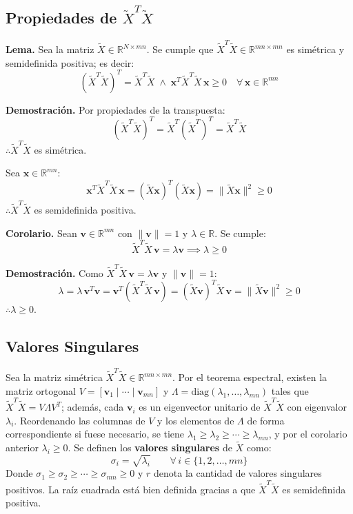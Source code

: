 \subsection{Propiedades de $\tilde{X}^T\tilde{X}$}

\textbf{Lema.} Sea la matriz $\tilde{X} \in \mathbb{R}^{N \times mn}$. Se cumple
que $\tilde{X}^T\tilde{X} \in \mathbb{R}^{mn \times mn}$ es simétrica y
semidefinida positiva; es decir:
\[
(\tilde{X}^T\tilde{X})^T = \tilde{X}^T\tilde{X}
\;\land\;
\mathbf{x}^T\tilde{X}^T\tilde{X}\,\mathbf{x} \geq 0
\quad \forall \, \mathbf{x} \in \mathbb{R}^{mn}
\]

\textbf{Demostración.} Por propiedades de la transpuesta:
\[
(\tilde{X}^T\tilde{X})^T = \tilde{X}^T(\tilde{X}^T)^T = \tilde{X}^T\tilde{X}
\]
$\therefore \tilde{X}^T\tilde{X}$ es simétrica.

Sea $\mathbf{x} \in \mathbb{R}^{mn}$:
\[
\mathbf{x}^T\tilde{X}^T\tilde{X}\,\mathbf{x}
= (\tilde{X}\mathbf{x})^T(\tilde{X}\mathbf{x})
= \|\tilde{X}\mathbf{x}\|^2 \geq 0
\]
$\therefore \tilde{X}^T\tilde{X}$ es semidefinida positiva.

\textbf{Corolario.} Sean $\mathbf{v} \in \mathbb{R}^{mn}$ con
$\|\mathbf{v}\| = 1$ y $\lambda \in \mathbb{R}$. Se cumple:
\[
\tilde{X}^T\tilde{X}\,\mathbf{v} = \lambda\mathbf{v} \implies \lambda \geq 0
\]

\textbf{Demostración.} Como $\tilde{X}^T\tilde{X}\,\mathbf{v} = \lambda\mathbf{v}$
y $\|\mathbf{v}\| = 1$:
\[
\lambda = \lambda\,\mathbf{v}^T\mathbf{v}
= \mathbf{v}^T(\tilde{X}^T\tilde{X}\,\mathbf{v})
= (\tilde{X}\mathbf{v})^T\tilde{X}\,\mathbf{v}
= \|\tilde{X}\mathbf{v}\|^2 \geq 0
\]
$\therefore \lambda \geq 0$.


\subsection{Valores Singulares}

Sea la matriz simétrica $\tilde{X}^T\tilde{X} \in \mathbb{R}^{mn \times mn}$.
Por el teorema espectral, existen la matriz ortogonal
$V = [\mathbf{v}_1 \mid \cdots \mid \mathbf{v}_{mn}]$ y
$\Lambda = \text{diag}(\lambda_1, \dots, \lambda_{mn})$ tales que
$\tilde{X}^T\tilde{X} = V\Lambda V^T$; además, cada $\mathbf{v}_i$ es un
eigenvector unitario de $\tilde{X}^T\tilde{X}$ con eigenvalor $\lambda_i$.
Reordenando las columnas de $V$ y los elementos de $\Lambda$ de forma
correspondiente si fuese necesario, se tiene $\lambda_1 \geq \lambda_2 \geq
\cdots \geq \lambda_{mn}$, y por el corolario anterior $\lambda_i \geq 0$.
Se definen los \textbf{valores singulares} de $\tilde{X}$ como:
\[
\sigma_i = \sqrt{\lambda_i} \qquad \forall \, i \in \{1, 2, \dots, mn\}
\]
Donde $\sigma_1 \geq \sigma_2 \geq \cdots \geq \sigma_{mn} \geq 0$ y $r$ denota
la cantidad de valores singulares positivos. La raíz cuadrada está bien
definida gracias a que $\tilde{X}^T\tilde{X}$ es semidefinida positiva.

